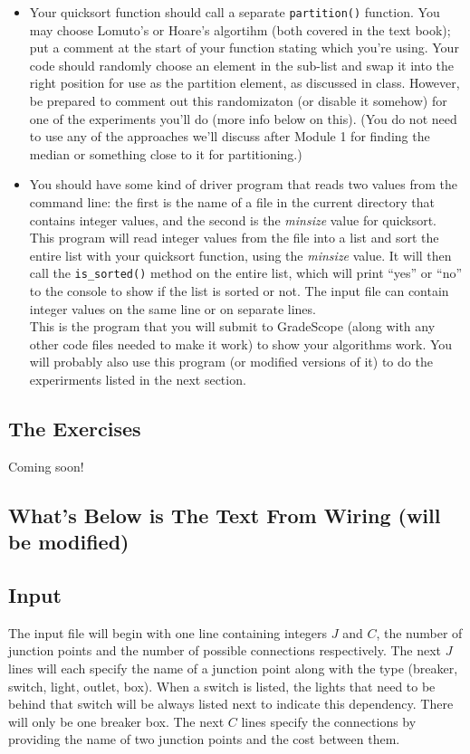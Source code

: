 \documentclass[11pt]{article}
\begin{document}
\begin{itemize}
	\item Your quicksort function should call a separate {\tt partition()} function. You may choose Lomuto's or Hoare's algortihm (both covered in the text book); put a comment at the start of your function stating which you're using.  Your code should randomly choose an element in the sub-list and swap it into the right position for use as the partition element, as discussed in class.  However, be prepared to comment out this randomizaton (or disable it somehow) for one of the experiments you'll do (more info below on this).  (You do not need to use any of the approaches we'll discuss after Module 1 for finding the median or something close to it for partitioning.)
	
	\item You should have some kind of driver program that reads two values from the command line:  the first is the name of a file in the current directory that contains integer values, and the second is the {\em minsize} value for quicksort.  This program will read integer values from the file into a list and sort the entire list with your quicksort function, using the {\em minsize} value.  It will then call the {\tt is\_sorted()} method on the entire list, which will print ``yes'' or ``no'' to the console to show if the list is sorted or not.  The input file can contain integer values on the same line or on separate lines. \\
	This is the program that you will submit to GradeScope (along with any other code files needed to make it work) to show your algorithms work. You will probably also use this program (or modified versions of it) to do the experirments listed in the next section.

\end{itemize}

\subsection*{The Exercises}

Coming soon!


\subsection*{What's Below is The Text From Wiring (will be modified)}

\subsection*{Input}
The input file will begin with one line containing integers $J$ and $C$, the number of junction points and the number of possible connections respectively. The next $J$ lines will each specify the name of a junction point along with the type (breaker, switch, light, outlet, box). When a switch is listed, the lights that need to be behind that switch will be always listed next to indicate this dependency. There will only be one breaker box. The next $C$ lines specify the connections by providing the name of two junction points and the cost between them.
\end{document}
